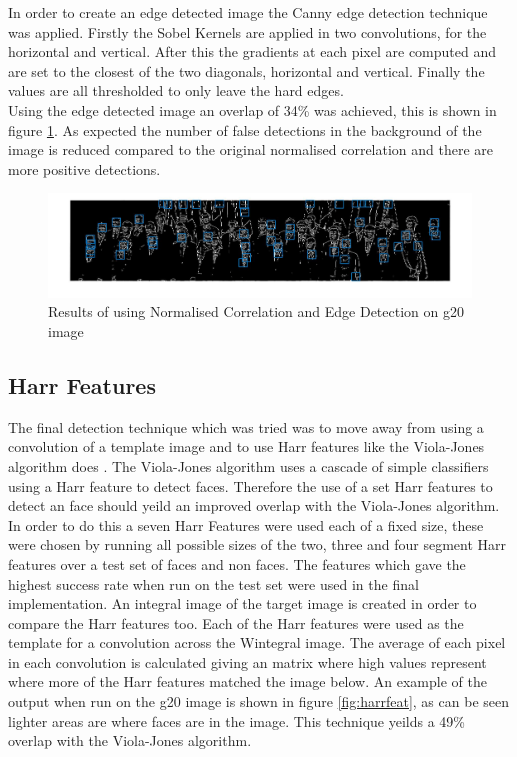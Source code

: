 \documentclass{article}
\begin{document}
In order to create an edge detected image the Canny edge detection technique was
applied. Firstly the Sobel Kernels are applied in two
convolutions, for the horizontal and vertical. After this the gradients at each pixel
are computed and are set to the closest of the two diagonals, horizontal and vertical.
Finally the values are all thresholded to only leave the hard edges.\\

Using the edge detected image an overlap of 34\% was achieved, this is shown in
figure \ref{fig:edgedet}. As expected the number of false detections in the background
of the image is reduced compared to the original normalised correlation and there
are more positive detections.

\begin{figure}[H]
  \includegraphics[width=\linewidth]{edgedetect.jpg}
  \caption{Results of using Normalised Correlation and Edge Detection on g20 image}
  \label{fig:edgedet}
\end{figure}

\subsection{Harr Features}

The final detection technique which was tried was to move away from using a convolution
of a template image and to use Harr features like the Viola-Jones algorithm does \cite{viola2004robust}.
The Viola-Jones algorithm uses a cascade of simple classifiers using a Harr feature
to detect faces. Therefore the use of a set Harr features to detect an face should yeild
an improved overlap with the Viola-Jones algorithm.\\

In order to do this a seven Harr Features were used each of a fixed size, these
were chosen by running all possible sizes of the two, three and four segment Harr
features over a test set of faces and non faces. The features which gave the highest
success rate when run on the test set were used in the final implementation. An
integral image of the target image is created in order to compare the Harr features
too. Each of the Harr features were used as the template for a convolution across the
Wintegral image. The average of each pixel in each convolution is calculated giving an
matrix where high values represent where more of the Harr features matched the image below.
An example of the output when run on the g20 image is shown in figure \ref{fig:harrfeat},
as can be seen lighter areas are where faces are in the image. This technique yeilds
a 49\% overlap with the Viola-Jones algorithm.
\end{document}
